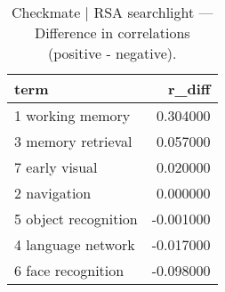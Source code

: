 \begin{table}
\caption{Checkmate | RSA searchlight — Difference in correlations (positive - negative).}
\label{tab:Checkmate | RSA searchlight_diff}
\begin{tabular}{lr}
\toprule
term & r\_diff \\
\midrule
1 working memory & 0.304000 \\
3 memory retrieval & 0.057000 \\
7 early visual & 0.020000 \\
2 navigation & 0.000000 \\
5 object recognition & -0.001000 \\
4 language network & -0.017000 \\
6 face recognition & -0.098000 \\
\bottomrule
\end{tabular}
\end{table}
